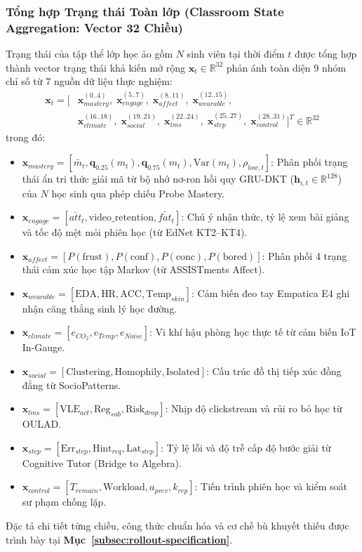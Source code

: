 \subsubsection{Tổng hợp Trạng thái Toàn lớp (Classroom State Aggregation: Vector 32 Chiều)}\label{subsubsec:state-32d-intro}
Trạng thái của tập thể lớp học ảo gồm $N$ sinh viên tại thời điểm $t$ được tổng hợp thành vector trạng thái khả kiến mở rộng $\mathbf{x}_t \in \mathbb{R}^{32}$ phản ánh toàn diện 9 nhóm chỉ số từ 7 nguồn dữ liệu thực nghiệm:
\begin{equation}\label{eq:class-state-32d}
\begin{aligned}
  \mathbf{x}_t = \Big[ & \mathbf{x}_{mastery}^{(0..4)}, \; \mathbf{x}_{engage}^{(5..7)}, \; \mathbf{x}_{affect}^{(8..11)}, \; \mathbf{x}_{wearable}^{(12..15)}, \\
                       & \mathbf{x}_{climate}^{(16..18)}, \; \mathbf{x}_{social}^{(19..21)}, \; \mathbf{x}_{lms}^{(22..24)}, \; \mathbf{x}_{step}^{(25..27)}, \; \mathbf{x}_{control}^{(28..31)} \Big]^T \in \mathbb{R}^{32}
\end{aligned}
\end{equation}
trong đó:
\begin{itemize}
  \item $\mathbf{x}_{mastery} = [\bar{m}_t, \mathbf{q}_{0.25}(m_t), \mathbf{q}_{0.75}(m_t), \text{Var}(m_t), \rho_{low, t}]$: Phân phối trạng thái ẩn tri thức giải mã từ bộ nhớ nơ-ron hồi quy GRU-DKT ($\mathbf{h}_{i, t} \in \mathbb{R}^{128}$) của $N$ học sinh qua phép chiếu Probe Mastery.
  \item $\mathbf{x}_{engage} = [\bar{att}_t, \text{video\_retention}, \bar{fat}_t]$: Chú ý nhận thức, tỷ lệ xem bài giảng và tốc độ mệt mỏi phiên học (từ EdNet KT2--KT4).
  \item $\mathbf{x}_{affect} = [P(\text{frust}), P(\text{conf}), P(\text{conc}), P(\text{bored})]$: Phân phối 4 trạng thái cảm xúc học tập Markov (từ ASSISTments Affect).
  \item $\mathbf{x}_{wearable} = [\text{EDA}, \text{HR}, \text{ACC}, \text{Temp}_{skin}]$: Cảm biến đeo tay Empatica E4 ghi nhận căng thẳng sinh lý học đường.
  \item $\mathbf{x}_{climate} = [e_{CO_2}, e_{Temp}, e_{Noise}]$: Vi khí hậu phòng học thực tế từ cảm biến IoT In-Gauge.
  \item $\mathbf{x}_{social} = [\text{Clustering}, \text{Homophily}, \text{Isolated}]$: Cấu trúc đồ thị tiếp xúc đồng đẳng từ SocioPatterns.
  \item $\mathbf{x}_{lms} = [\text{VLE}_{act}, \text{Reg}_{sub}, \text{Risk}_{drop}]$: Nhịp độ clickstream và rủi ro bỏ học từ OULAD.
  \item $\mathbf{x}_{step} = [\text{Err}_{step}, \text{Hint}_{req}, \text{Lat}_{step}]$: Tỷ lệ lỗi và độ trễ cấp độ bước giải từ Cognitive Tutor (Bridge to Algebra).
  \item $\mathbf{x}_{control} = [T_{remain}, \text{Workload}, a_{prev}, k_{rep}]$: Tiến trình phiên học và kiểm soát sư phạm chống lặp.
\end{itemize}
\noindent Đặc tả chi tiết từng chiều, công thức chuẩn hóa và cơ chế bù khuyết thiếu được trình bày tại \textbf{Mục~\ref{subsec:rollout-specification}}.

